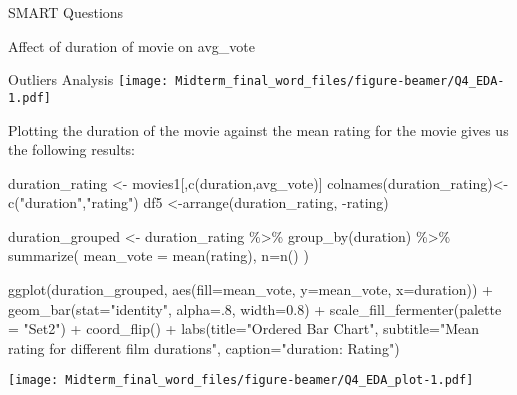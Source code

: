 \documentclass[
  ignorenonframetext,
]{beamer}
\newenvironment{Shaded}{\begin{snugshade}}{\end{snugshade}}
\newcommand{\AttributeTok}[1]{\textcolor[rgb]{0.77,0.63,0.00}{#1}}
\newcommand{\DecValTok}[1]{\textcolor[rgb]{0.00,0.00,0.81}{#1}}
\newcommand{\FloatTok}[1]{\textcolor[rgb]{0.00,0.00,0.81}{#1}}
\newcommand{\FunctionTok}[1]{\textcolor[rgb]{0.00,0.00,0.00}{#1}}
\newcommand{\NormalTok}[1]{#1}
\newcommand{\OtherTok}[1]{\textcolor[rgb]{0.56,0.35,0.01}{#1}}
\newcommand{\SpecialCharTok}[1]{\textcolor[rgb]{0.00,0.00,0.00}{#1}}
\newcommand{\StringTok}[1]{\textcolor[rgb]{0.31,0.60,0.02}{#1}}
\begin{document}
\begin{frame}[fragile]{SMART Questions}
\begin{block}{Affect of duration of movie on avg\_vote}
\begin{block}{Outliers Analysis}
\texttt{[image: Midterm\_final\_word\_files/figure-beamer/Q4\_EDA-1.pdf]}

Plotting the duration of the movie against the mean rating for the movie
gives us the following results:

\begin{Shaded}
\begin{Highlighting}[]
\NormalTok{duration\_rating }\OtherTok{\textless{}{-}}\NormalTok{ movies1[,}\FunctionTok{c}\NormalTok{(}\StringTok{\textquotesingle{}duration\textquotesingle{}}\NormalTok{,}\StringTok{\textquotesingle{}avg\_vote\textquotesingle{}}\NormalTok{)]}
\FunctionTok{colnames}\NormalTok{(duration\_rating)}\OtherTok{\textless{}{-}}\FunctionTok{c}\NormalTok{(}\StringTok{"duration"}\NormalTok{,}\StringTok{"rating"}\NormalTok{)}
\NormalTok{df5 }\OtherTok{\textless{}{-}}\FunctionTok{arrange}\NormalTok{(duration\_rating, }\SpecialCharTok{{-}}\NormalTok{rating)}


\NormalTok{duration\_grouped }\OtherTok{\textless{}{-}}\NormalTok{ duration\_rating }\SpecialCharTok{\%\textgreater{}\%}
  \FunctionTok{group\_by}\NormalTok{(duration) }\SpecialCharTok{\%\textgreater{}\%}
    \FunctionTok{summarize}\NormalTok{(}
      \AttributeTok{mean\_vote =} \FunctionTok{mean}\NormalTok{(rating),}
      \AttributeTok{n=}\FunctionTok{n}\NormalTok{()}
\NormalTok{    )}

\FunctionTok{ggplot}\NormalTok{(duration\_grouped, }\FunctionTok{aes}\NormalTok{(}\AttributeTok{fill=}\NormalTok{mean\_vote, }\AttributeTok{y=}\NormalTok{mean\_vote, }\AttributeTok{x=}\NormalTok{duration)) }\SpecialCharTok{+}
    \FunctionTok{geom\_bar}\NormalTok{(}\AttributeTok{stat=}\StringTok{"identity"}\NormalTok{, }\AttributeTok{alpha=}\NormalTok{.}\DecValTok{8}\NormalTok{, }\AttributeTok{width=}\FloatTok{0.8}\NormalTok{) }\SpecialCharTok{+}
      \FunctionTok{scale\_fill\_fermenter}\NormalTok{(}\AttributeTok{palette =} \StringTok{"Set2"}\NormalTok{) }\SpecialCharTok{+}
        \FunctionTok{coord\_flip}\NormalTok{() }\SpecialCharTok{+}
            \FunctionTok{labs}\NormalTok{(}\AttributeTok{title=}\StringTok{"Ordered Bar Chart"}\NormalTok{,}
                \AttributeTok{subtitle=}\StringTok{"Mean rating for different film durations"}\NormalTok{,}
                \AttributeTok{caption=}\StringTok{"duration: Rating"}\NormalTok{)}
\end{Highlighting}
\end{Shaded}

\texttt{[image: Midterm\_final\_word\_files/figure-beamer/Q4\_EDA\_plot-1.pdf]}
\end{block}


\end{block}
\end{frame}
\end{document}
